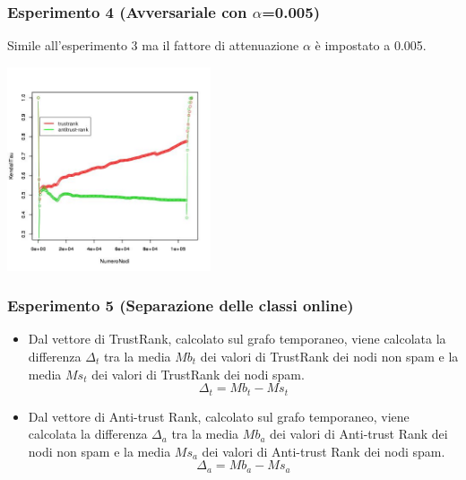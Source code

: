 \documentclass{beamer}
\begin{document}
\begin{frame}
\frametitle{Esperimento 4 {\tiny(Avversariale con \(\alpha\)=0.005)}}
Simile all'esperimento 3 ma il fattore di attenuazione \(\alpha\)  è impostato a 0.005.
   \begin{center}
 \includegraphics[height=6cm]{immagini/test4/coplotTrustAnti_Mode1_set3776_62_alpha0005}
\end{center}
\end{frame}
\begin{frame}
\frametitle{Esperimento 5 {\tiny(Separazione delle classi online)}}
\begin{itemize}
 \item Dal vettore di TrustRank,  calcolato sul grafo temporaneo, viene calcolata la differenza \(\Delta_t\) tra la media \(Mb_t\) dei valori di TrustRank dei nodi non spam e la media \(Ms_t\) dei valori di TrustRank dei nodi spam.
 \begin{equation}
 \Delta_t = Mb_t-Ms_t
\end{equation}
  \item Dal vettore di Anti-trust Rank,  calcolato sul grafo temporaneo, viene calcolata la differenza \(\Delta_a\) tra la media \(Mb_a\) dei valori di Anti-trust Rank dei nodi non spam e la media \(Ms_a\) dei valori di Anti-trust Rank dei nodi spam.
  \begin{equation}
 \Delta_a=Mb_a-Ms_a
\end{equation}
\end{itemize}
\end{frame}
\end{document}
